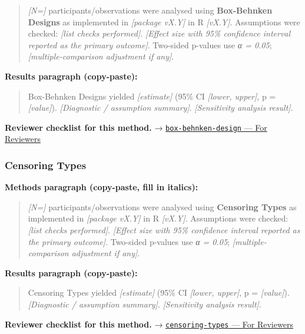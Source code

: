 \documentclass[
]{article}
\begin{document}
\begin{quote}
\emph{{[}N={]}} participants/observations were analysed using
\textbf{Box-Behnken Designs} as implemented in \emph{{[}package vX.Y{]}}
in R \emph{{[}vX.Y{]}}. Assumptions were checked: \emph{{[}list checks
performed{]}}. \emph{{[}Effect size with 95\% confidence interval
reported as the primary outcome{]}}. Two-sided p-values use \emph{α =
0.05}; \emph{{[}multiple-comparison adjustment if any{]}}.
\end{quote}

\textbf{Results paragraph (copy-paste):}

\begin{quote}
Box-Behnken Designs yielded \emph{{[}estimate{]}} (95\% CI
\emph{{[}lower, upper{]}}, p = \emph{{[}value{]}}). \emph{{[}Diagnostic
/ assumption summary{]}}. \emph{{[}Sensitivity analysis result{]}}.
\end{quote}

\textbf{Reviewer checklist for this method.} →
\href{../chapters/16-design/box-behnken-design.Rmd\#for-reviewers}{\texttt{box-behnken-design}
--- For Reviewers}

\subsubsection{Censoring Types}\label{censoring-types}

\textbf{Methods paragraph (copy-paste, fill in italics):}

\begin{quote}
\emph{{[}N={]}} participants/observations were analysed using
\textbf{Censoring Types} as implemented in \emph{{[}package vX.Y{]}} in
R \emph{{[}vX.Y{]}}. Assumptions were checked: \emph{{[}list checks
performed{]}}. \emph{{[}Effect size with 95\% confidence interval
reported as the primary outcome{]}}. Two-sided p-values use \emph{α =
0.05}; \emph{{[}multiple-comparison adjustment if any{]}}.
\end{quote}

\textbf{Results paragraph (copy-paste):}

\begin{quote}
Censoring Types yielded \emph{{[}estimate{]}} (95\% CI \emph{{[}lower,
upper{]}}, p = \emph{{[}value{]}}). \emph{{[}Diagnostic / assumption
summary{]}}. \emph{{[}Sensitivity analysis result{]}}.
\end{quote}

\textbf{Reviewer checklist for this method.} →
\href{../chapters/11-survival/censoring-types.Rmd\#for-reviewers}{\texttt{censoring-types}
--- For Reviewers}
\end{document}
